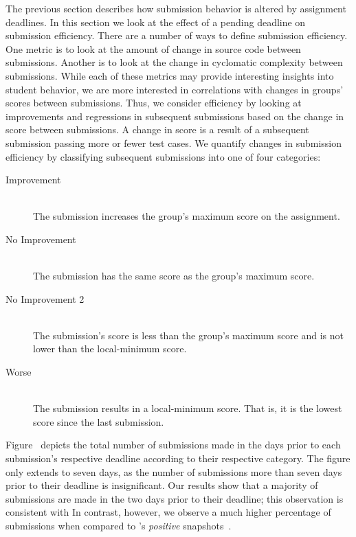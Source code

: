 The previous section describes how submission behavior is altered by assignment
deadlines. In this section we look at the effect of a pending deadline on
submission efficiency. There are a number of ways to define submission
efficiency. One metric is to look at the amount of change in source code
between submissions. Another is to look at the change in cyclomatic complexity
between submissions. While each of these metrics may provide interesting
insights into student behavior, we are more interested in correlations with
changes in groups' scores between submissions. Thus, we consider efficiency by
looking at improvements and regressions in subsequent submissions based on the
change in score between submissions. A change in score is a result of a
subsequent submission passing more or fewer test cases. We quantify changes in
submission efficiency by classifying subsequent submissions into one of four
categories:

\begin{description}
  \item[Improvement] \hfill \\ The submission increases the group's maximum
    score on the assignment.
  \item[No Improvement] \hfill \\ The submission has the same score as the
    group's maximum score.
  \item[No Improvement 2] \hfill \\ The submission's score is less than the
    group's maximum score and is not lower than the local-minimum score.
  \item[Worse] \hfill \\ The submission results in a local-minimum score. That
    is, it is the lowest score since the last \imp{} submission.
\end{description}

Figure~ depicts the total number of submissions
made in the days prior to each submission's respective deadline according to
their respective category. The figure only extends to seven days, as the number
of submissions more than seven days prior to their deadline is
insignificant. Our results show that a majority of submissions are made in the
two days prior to their deadline; this observation is consistent with
\spacco[.]{} In contrast, however, we observe a much higher percentage of
\imp{} submissions when compared to \spacco{}'s \emph{positive}
snapshots~\cite{Spacco:2013:TIP:2462476.2465594}.

